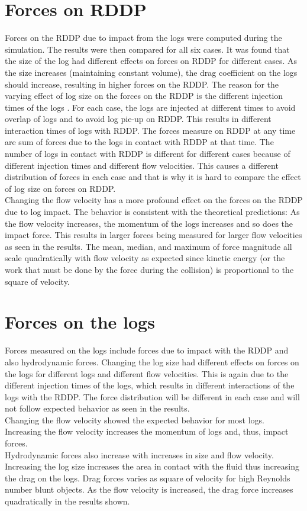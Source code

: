 \section{Forces on RDDP}
Forces on the RDDP due to impact from the logs were computed during the simulation. The results were then compared for all six cases. It was found that the size of the log had different effects on forces on RDDP for different cases. As the size increases (maintaining constant volume), the drag coefficient on the logs should increase, resulting in higher forces on the RDDP. The reason for the varying effect of log size on the forces on the RDDP is the different injection times of the logs%
. For each case, the logs are injected at different times to avoid overlap of logs and to avoid log pie-up on RDDP. This results in different interaction times of logs with RDDP. The forces measure on RDDP at any time are sum of forces due to the logs in contact with RDDP at that time. The number of logs in contact with RDDP is different for different cases because of different injection times and different flow velocities. This causes a different distribution of forces in each case and that is why it is hard to compare the effect of log size on forces on RDDP.\\
Changing the flow velocity has a more profound effect on the forces on the RDDP due to log impact. The behavior is consistent with the theoretical predictions: As the flow velocity increases, the momentum of the logs increases and so does the impact force. This results in larger forces being measured for larger flow velocities as seen in the results. The mean, median, and maximum of force magnitude all scale quadratically with flow velocity as expected since kinetic energy (or the work that must be done by the force during the collision) is proportional to the square of velocity. 

\section{Forces on the logs}
Forces measured on the logs include forces due to impact with the RDDP and also hydrodynamic forces. Changing the log size had different effects on forces on the logs for different logs and different flow velocities. This is again due to the different injection times of the logs, which results in different interactions of the logs with the RDDP. The force distribution will be different in each case and will not follow expected behavior as seen in the results.\\
Changing the flow velocity showed the expected behavior for most logs. Increasing the flow velocity increases the momentum of logs and, thus, impact forces.\\
Hydrodynamic forces also increase with increases in size and flow velocity. Increasing the log size increases the area in contact with the fluid thus increasing the drag on the logs. Drag forces varies as square of velocity for high Reynolds number blunt objects. As the flow velocity is increased, the drag force increases quadratically in the results shown. 

